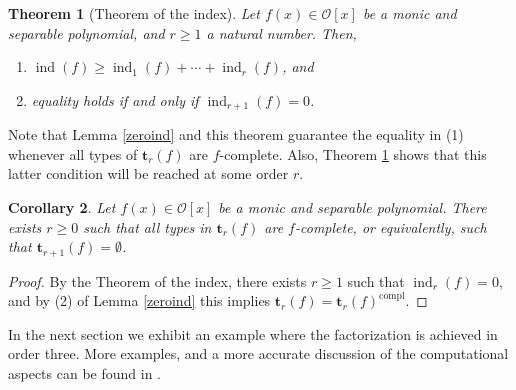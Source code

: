 \documentclass{amsart}
\newtheorem{theorem}{Theorem}[section]
\newtheorem{corollary}[theorem]{Corollary}
\def\op{\operatorname}
\def\ind{\op{ind}}
\def\oo{{\mathcal O}}
\def\ty{\mathbf{t}}
\def\zpx{\oo[x]}
\begin{document}
\begin{theorem}[Theorem of the index] \label{thindex}
Let $f(x)\in\zpx$ be a monic and separable polynomial, and $r\ge 1$ a natural number. Then,
\begin{enumerate}
 \item $\ind(f)\ge \ind_1(f)+\cdots +\ind_r(f)$, and
\item equality holds if and only if $\ind_{r+1}(f)=0$. 
\end{enumerate}
\end{theorem}

Note that Lemma \ref{zeroind} and this theorem guarantee the equality in (1)
whenever all types of $\ty_r(f)$ are $f$-complete. Also, Theorem \ref{thindex} shows that this latter condition will be reached at some order $r$.

\begin{corollary}
Let $f(x)\in\zpx$ be a monic and separable polynomial. There exists $r\ge 0$ such that all types in $\ty_r(f)$ are $f$-complete, or equivalently, such that $\ty_{r+1}(f)=\emptyset$.
\end{corollary}

\begin{proof}
By the Theorem of the index, there exists $r\ge1$ such that $\ind_r(f)=0$, and by (2) of Lemma \ref{zeroind}
this implies $\ty_r(f)=\ty_r(f)^{\op{compl}}$.
\end{proof}

In the next section we exhibit an example where the factorization is achieved in order three. More examples, and a more accurate discussion of the computational aspects can be found in \cite{gmna}.
\end{document}
